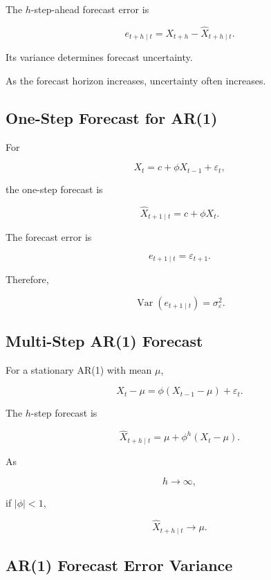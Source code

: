 The \(h\)-step-ahead forecast error is

\[
\boxed{
e_{t+h\mid t}
=
X_{t+h}
-
\widehat{X}_{t+h\mid t}.
}
\]

Its variance determines forecast uncertainty.

As the forecast horizon increases, uncertainty often increases.

\subsection{One-Step Forecast for AR(1)}
\label{subsec:ar1-one-step-forecast}

For

\[
X_t
=
c
+
\phi X_{t-1}
+
\varepsilon_t,
\]

the one-step forecast is

\[
\boxed{
\widehat{X}_{t+1\mid t}
=
c
+
\phi X_t.
}
\]

The forecast error is

\[
\boxed{
e_{t+1\mid t}
=
\varepsilon_{t+1}.
}
\]

Therefore,

\[
\boxed{
\operatorname{Var}
(
e_{t+1\mid t}
)
=
\sigma_\varepsilon^2.
}
\]

\subsection{Multi-Step AR(1) Forecast}
\label{subsec:ar1-multistep-forecast}

For a stationary AR(1) with mean \(\mu\),

\[
X_t-\mu
=
\phi
(
X_{t-1}-\mu
)
+
\varepsilon_t.
\]

The \(h\)-step forecast is

\[
\boxed{
\widehat{X}_{t+h\mid t}
=
\mu
+
\phi^h
(
X_t-\mu
).
}
\]

As

\[
h\to\infty,
\]

if \(|\phi|<1\),

\[
\boxed{
\widehat{X}_{t+h\mid t}
\to
\mu.
}
\]

\subsection{AR(1) Forecast Error Variance}
\label{subsec:ar1-forecast-error-variance}

